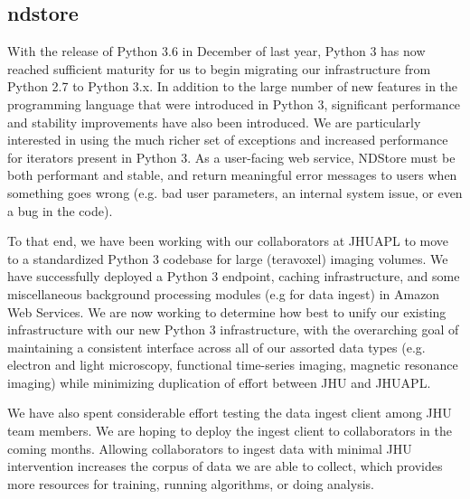 \documentclass[simplex.tex]{subfiles}
\begin{document}
\subsection[ndstore]{ndstore}

With the release of Python 3.6 in December of last year, Python 3 has now reached sufficient maturity for us to begin migrating our infrastructure from Python 2.7 to Python 3.x. In addition to the large number of new features in the programming language that were introduced in Python 3, significant performance and stability improvements have also been introduced. We are particularly interested in using the much richer set of exceptions and increased performance for iterators present in Python 3. As a user-facing web service, NDStore must be both performant and stable, and return meaningful error messages to users when something goes wrong (e.g. bad user parameters, an internal system issue, or even a bug in the code). 


To that end, we have been working with our collaborators at JHUAPL to move to a standardized Python 3 codebase for large (teravoxel) imaging volumes. We have successfully deployed a Python 3 endpoint, caching infrastructure, and some miscellaneous background processing modules (e.g for data ingest) in Amazon Web Services. We are now working to determine how best to unify our existing infrastructure with our new Python 3 infrastructure, with the overarching goal of maintaining a consistent interface across all of our assorted data types (e.g. electron and light microscopy, functional time-series imaging, magnetic resonance imaging) while minimizing duplication of effort between JHU and JHUAPL. 


We have also spent considerable effort testing the data ingest client among JHU team members. We are hoping to deploy the ingest client to collaborators in the coming months. Allowing collaborators to ingest data with minimal JHU intervention increases the corpus of data we are able to collect, which provides more resources for training, running algorithms, or doing analysis. 

\clearpage
\end{document}
